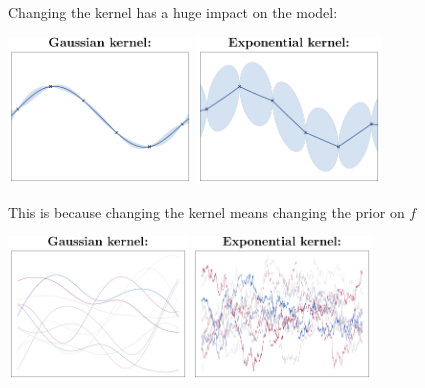 \documentclass{beamer}
\begin{document}
\begin{frame}{}
Changing the kernel \alert{has a huge impact on the model}:\\
\vspace{5mm}
\begin{center}
\includegraphics[height=3.9cm]{figures/Fig2-GP-rbf} \qquad
\includegraphics[height=3.9cm]{figures/Fig2-GP-exp}
\end{center}
\end{frame}

\begin{frame}{}
This is because changing the kernel means changing the prior on $f$\\
\vspace{5mm}
\begin{center}
\includegraphics[height=3.8cm]{figures/Fig2-sim-rbf} \qquad
\includegraphics[height=3.8cm]{figures/Fig2-sim-exp}
\end{center}
\end{frame}
\end{document}
